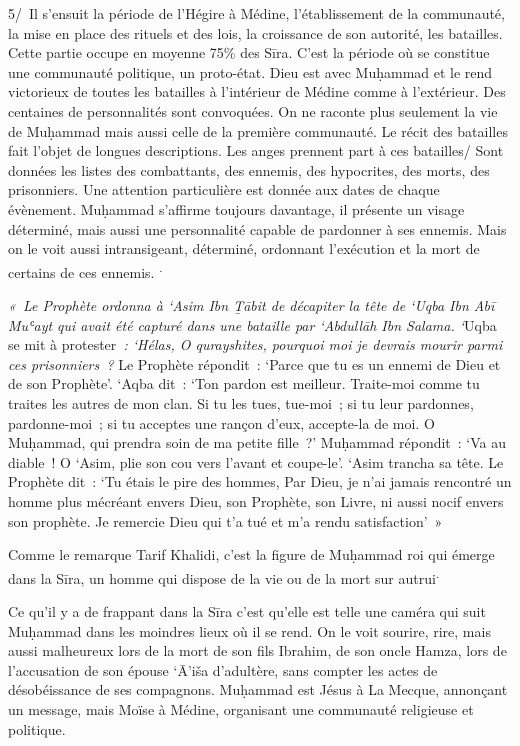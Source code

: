 5/~Il s'ensuit la période de l'Hégire à Médine, l'établissement de la
communauté, la mise en place des rituels et des lois, la croissance de
son autorité, les batailles. Cette partie occupe en moyenne 75\% des
Sīra. C'est la période où se constitue une communauté politique, un
proto-état. Dieu est avec Muḥammad et le rend victorieux de toutes les
batailles à l'intérieur de Médine comme à l'extérieur. Des centaines de
personnalités sont convoquées. On ne raconte plus seulement la vie de
Muḥammad mais aussi celle de la première communauté. Le récit des
batailles fait l'objet de longues descriptions. Les anges prennent part
à ces batailles/ Sont données les listes des combattants, des ennemis,
des hypocrites, des morts, des prisonniers. Une attention particulière
est donnée aux dates de chaque évènement. Muḥammad s'affirme toujours
davantage, il présente un visage déterminé, mais aussi une personnalité
capable de pardonner à ses ennemis. Mais on le voit aussi intransigeant,
déterminé, ordonnant l'exécution et la mort de certains de ces ennemis. \textsuperscript{.}
\begin{cite}
\emph{«~Le Prophète ordonna à `Asim Ibn Ṯābit de décapiter la tête de
`Uqba Ibn Abī Muʿayt qui avait été capturé dans une bataille par
`Abdullāh Ibn Salama. `}Uqba se mit à protester\emph{~: `Hélas, O
qurayshites, pourquoi moi je devrais mourir parmi ces prisonniers~?} Le
Prophète répondit~: `Parce que tu es un ennemi de Dieu et de son
Prophète'. `Aqba dit~: `Ton pardon est meilleur. Traite-moi comme tu
traites les autres de mon clan. Si tu les tues, tue-moi~; si tu leur
pardonnes, pardonne-moi~; si tu acceptes une rançon d'eux, accepte-la de
moi. O Muḥammad, qui prendra soin de ma petite fille~?' Muḥammad
répondit~: `Va au diable~! O `Asim, plie son cou vers l'avant et
coupe-le'. `Asim trancha sa tête. Le Prophète dit~: `Tu étais le pire
des hommes, Par Dieu, je n'ai jamais rencontré un homme plus mécréant
envers Dieu, son Prophète, son Livre, ni aussi nocif envers son
prophète. Je remercie Dieu qui t'a tué et m'a rendu
satisfaction'~»
\end{cite}


Comme le remarque Tarif Khalidi, c'est la figure de Muḥammad roi qui
émerge dans la Sīra, un homme qui dispose de la vie ou de la mort sur
autrui\textsuperscript{.}

Ce qu'il y a de frappant dans la Sīra c'est qu'elle est telle une caméra
qui suit Muḥammad dans les moindres lieux où il se rend. On le voit
sourire, rire, mais aussi malheureux lors de la mort de son fils
Ibrahim, de son oncle Hamza, lors de l'accusation de son épouse `Ā'iša
d'adultère, sans compter les actes de désobéissance de ses compagnons.
Muḥammad est Jésus à La Mecque, annonçant un message, mais Moïse à
Médine, organisant une communauté religieuse et politique.

